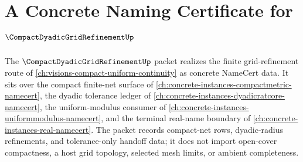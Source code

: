 \chapter{A Concrete Naming Certificate for $\CompactDyadicGridRefinementUp$}
\label{ch:concrete-instances-compact-dyadic-grid-refinement-namecert}

The $\CompactDyadicGridRefinementUp$ packet realizes the finite grid-refinement route of \autoref{ch:visions-compact-uniform-continuity} as concrete NameCert data. It sits over the compact finite-net surface of \autoref{ch:concrete-instances-compactmetric-namecert}, the dyadic tolerance ledger of \autoref{ch:concrete-instances-dyadicratcore-namecert}, the uniform-modulus consumer of \autoref{ch:concrete-instances-uniformmodulus-namecert}, and the terminal real-name boundary of \autoref{ch:concrete-instances-real-namecert}. The packet records compact-net rows, dyadic-radius refinements, and tolerance-only handoff data; it does not import open-cover compactness, a host grid topology, selected mesh limits, or ambient completeness.

